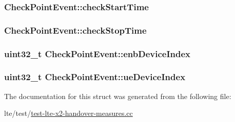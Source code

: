 \subsubsection[{\texorpdfstring{check\+Start\+Time}{checkStartTime}}]{ Check\+Point\+Event\+::check\+Start\+Time}\hypertarget{structCheckPointEvent_abc7b70eb318cabfefad8e615d5bc1c05}{}\label{structCheckPointEvent_abc7b70eb318cabfefad8e615d5bc1c05}
\subsubsection[{\texorpdfstring{check\+Stop\+Time}{checkStopTime}}]{ Check\+Point\+Event\+::check\+Stop\+Time}\hypertarget{structCheckPointEvent_a1ef475a385dcd5231f2dc1b7fb35e195}{}\label{structCheckPointEvent_a1ef475a385dcd5231f2dc1b7fb35e195}
\subsubsection[{\texorpdfstring{enb\+Device\+Index}{enbDeviceIndex}}]{\setlength{\rightskip}{0pt plus 5cm}uint32\+\_\+t Check\+Point\+Event\+::enb\+Device\+Index}\hypertarget{structCheckPointEvent_a7710c8b390ece2f4d7892df546f1e2a3}{}\label{structCheckPointEvent_a7710c8b390ece2f4d7892df546f1e2a3}
\subsubsection[{\texorpdfstring{ue\+Device\+Index}{ueDeviceIndex}}]{\setlength{\rightskip}{0pt plus 5cm}uint32\+\_\+t Check\+Point\+Event\+::ue\+Device\+Index}\hypertarget{structCheckPointEvent_adf654de34393c38769d2d63056c8ac12}{}\label{structCheckPointEvent_adf654de34393c38769d2d63056c8ac12}


The documentation for this struct was generated from the following file\+:\begin{DoxyCompactItemize}
\item 
lte/test/\hyperlink{test-lte-x2-handover-measures_8cc}{test-\/lte-\/x2-\/handover-\/measures.\+cc}\end{DoxyCompactItemize}
